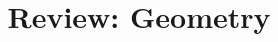 \documentclass[a4paper,12pt]{article}
\begin{document}
\title{Review: Geometry}
\newcommand\event{S.3,4 Elite Mathematics Training}
\newcommand\learningobjective{
\item Learn the basic properties of circles
}

\myfrontpage









\mynewpage
\begin{question}[]{3}
    
    
    
    
    
\end{question}
\end{document}

